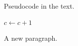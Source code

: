 \documentclass{article}
\begin{document}
Pseudocode in the text.

\begin{algorithmic}[1]
\State $c \gets c + 1$
\EndFor
\EndProcedure
\end{algorithmic}

A new paragraph.
\end{document}
